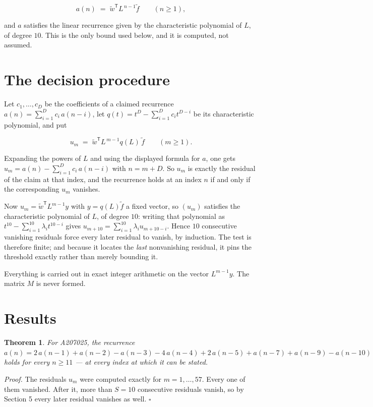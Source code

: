\documentclass[11pt]{article}
\newtheorem{theorem}{Theorem}
\theoremstyle{definition}
\begin{document}
\[a(n) \;=\; \tilde w^{\mathsf T} L^{\,n-1} \tilde f \qquad (n \ge 1),\]

and $a$ satisfies the linear recurrence given by the characteristic polynomial of $L$, of degree $10$. This is the only bound used below, and it is computed, not assumed.

\section{The decision procedure}

Let $c_1,\dots,c_D$ be the coefficients of a claimed recurrence $a(n) = \sum_{i=1}^{D} c_i\,a(n-i)$, let $q(t) = t^{D} - \sum_{i=1}^{D} c_i t^{D-i}$ be its characteristic polynomial, and put

\[u_m \;=\; \tilde w^{\mathsf T} L^{\,m-1} q(L)\,\tilde f \qquad (m \ge 1).\]

Expanding the powers of $L$ and using the displayed formula for $a$, one gets $u_m = a(n) - \sum_{i=1}^{D} c_i\,a(n-i)$ with $n = m + D$. So $u_m$ is exactly the residual of the claim at that index, and the recurrence holds at an index $n$ if and only if the corresponding $u_m$ vanishes.

Now $u_m = \tilde w^{\mathsf T} L^{m-1} y$ with $y = q(L)\tilde f$ a fixed vector, so $(u_m)$ satisfies the characteristic polynomial of $L$, of degree $10$: writing that polynomial as $t^{10} - \sum_{i=1}^{10} \lambda_i t^{10-i}$ gives $u_{m+10} = \sum_{i=1}^{10} \lambda_i u_{m+10-i}$. Hence $10$ consecutive vanishing residuals force every later residual to vanish, by induction. The test is therefore finite; and because it locates the {\itshape last} nonvanishing residual, it pins the threshold exactly rather than merely bounding it.

Everything is carried out in exact integer arithmetic on the vector $L^{m-1}y$. The matrix $M$ is never formed.

\section{Results}

\begin{theorem} For A207025, the recurrence $a(n) = 2\,a(n-1) + a(n-2) - a(n-3) - 4\,a(n-4) + 2\,a(n-5) + a(n-7) + a(n-9) - a(n-10)$ holds for every $n \ge 11$ --- at every index at which it can be stated.\end{theorem}

{\itshape Proof.} The residuals $u_m$ were computed exactly for $m = 1,\dots,57$. Every one of them vanished. After it, more than $S = 10$ consecutive residuals vanish, so by Section 5 every later residual vanishes as well. $\square$
\end{document}
